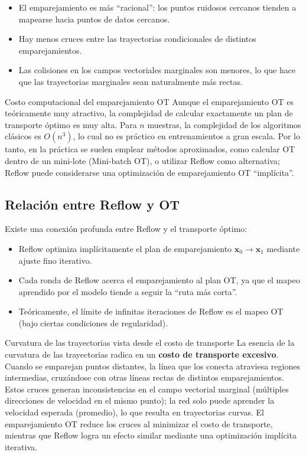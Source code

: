 \begin{itemize}
    \item El emparejamiento es más ``racional'': los puntos ruidosos cercanos tienden a mapearse hacia puntos de datos cercanos.
    \item Hay menos cruces entre las trayectorias condicionales de distintos emparejamientos.
    \item Las colisiones en los campos vectoriales marginales son menores, lo que hace que las trayectorias marginales sean naturalmente más rectas.
\end{itemize}

\begin{warningbox}{Costo computacional del emparejamiento OT}
Aunque el emparejamiento OT es teóricamente muy atractivo, la complejidad de calcular exactamente un plan de transporte óptimo es muy alta. Para $n$ muestras, la complejidad de los algoritmos clásicos es $O(n^3)$, lo cual no es práctico en entrenamientos a gran escala. Por lo tanto, en la práctica se suelen emplear métodos aproximados, como calcular OT dentro de un mini-lote (Mini-batch OT), o utilizar Reflow como alternativa; Reflow puede considerarse una optimización de emparejamiento OT ``implícita''.
\end{warningbox}

\subsection{Relación entre Reflow y OT}

Existe una conexión profunda entre Reflow y el transporte óptimo:

\begin{itemize}
    \item Reflow optimiza implícitamente el plan de emparejamiento $\mathbf{x}_0 \to \mathbf{x}_1$ mediante ajuste fino iterativo.
    \item Cada ronda de Reflow acerca el emparejamiento al plan OT, ya que el mapeo aprendido por el modelo tiende a seguir la ``ruta más corta''.
    \item Teóricamente, el límite de infinitas iteraciones de Reflow es el mapeo OT (bajo ciertas condiciones de regularidad).
\end{itemize}

\begin{knowledgebox}{Curvatura de las trayectorias vista desde el costo de transporte}
La esencia de la curvatura de las trayectorias radica en un \textbf{costo de transporte excesivo}. Cuando se emparejan puntos distantes, la línea que los conecta atraviesa regiones intermedias, cruzándose con otras líneas rectas de distintos emparejamientos. Estos cruces generan inconsistencias en el campo vectorial marginal (múltiples direcciones de velocidad en el mismo punto); la red solo puede aprender la velocidad esperada (promedio), lo que resulta en trayectorias curvas. El emparejamiento OT reduce los cruces al minimizar el costo de transporte, mientras que Reflow logra un efecto similar mediante una optimización implícita iterativa.
\end{knowledgebox}

